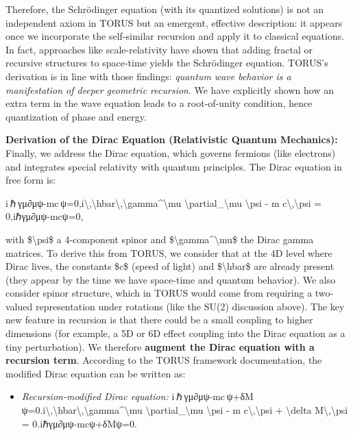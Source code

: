 \documentclass[
]{article}
\begin{document}
Therefore, the Schrödinger equation (with its quantized solutions) is
not an independent axiom in TORUS but an emergent, effective
description: it appears once we incorporate the self-similar recursion
and apply it to classical equations\hspace{0pt}. In fact, approaches
like scale-relativity have shown that adding fractal or recursive
structures to space-time yields the Schrödinger equation\hspace{0pt}.
TORUS's derivation is in line with those findings: \emph{quantum wave
behavior is a manifestation of deeper geometric recursion}. We have
explicitly shown how an extra term in the wave equation leads to a
root-of-unity condition, hence quantization of phase and energy.

\textbf{Derivation of the Dirac Equation (Relativistic Quantum
Mechanics):} Finally, we address the Dirac equation, which governs
fermions (like electrons) and integrates special relativity with quantum
principles. The Dirac equation in free form is:

i ℏ γμ∂μψ-mc ψ=0,i\textbackslash,\textbackslash hbar\textbackslash,\textbackslash gamma\^{}\textbackslash mu
\textbackslash partial\_\textbackslash mu \textbackslash psi - m
c\textbackslash,\textbackslash psi = 0,iℏγμ∂μ\hspace{0pt}ψ-mcψ=0,

with \$\textbackslash psi\$ a 4-component spinor and
\$\textbackslash gamma\^{}\textbackslash mu\$ the Dirac gamma matrices.
To derive this from TORUS, we consider that at the 4D level where Dirac
lives, the constants \$c\$ (speed of light) and \$\textbackslash hbar\$
are already present (they appear by the time we have space-time and
quantum behavior). We also consider spinor structure, which in TORUS
would come from requiring a two-valued representation under rotations
(like the SU(2) discussion above). The key new feature in recursion is
that there could be a small coupling to higher dimensions (for example,
a 5D or 6D effect coupling into the Dirac equation as a tiny
perturbation). We therefore \textbf{augment the Dirac equation with a
recursion term}. According to the TORUS framework documentation, the
modified Dirac equation can be written as\hspace{0pt}:

\begin{itemize}
\item
  \emph{Recursion-modified Dirac equation:}
  i ℏ γμ∂μψ-mc ψ+δM ψ=0.i\textbackslash,\textbackslash hbar\textbackslash,\textbackslash gamma\^{}\textbackslash mu
  \textbackslash partial\_\textbackslash mu \textbackslash psi - m
  c\textbackslash,\textbackslash psi + \textbackslash delta
  M\textbackslash,\textbackslash psi = 0.iℏγμ∂μ\hspace{0pt}ψ-mcψ+δMψ=0.
\end{itemize}
\end{document}
